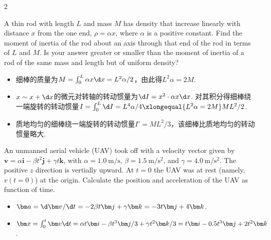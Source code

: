 \begin{paracol}{2}
    \begin{problem} %
        A thin rod with length $L$ and mass $M$ has density that increase linearly with distance $x$ from the one end, $\rho=\alpha x$, where $\alpha$ is a positive constant. Find the moment of inertia of the rod about an axis through that end of the rod in terms of $L$ and $M$. Is your answer greater or smaller than the moment of inertia of a rod of the same mass and length but of uniform density?
        \switchcolumn\vspace*{\fill}\centering
        \vspace*{\fill}
    \end{problem}
\end{paracol}
\begin{solution}\leavevmode
    \begin{itemize}
        \item 细棒的质量为$M=\int_0^L{\alpha x\d x}=L^2\alpha/2$，由此得$L^2\alpha=2M$.
        \item $x\sim x+\d x$的微元对转轴的转动惯量为$\d I=x^2\cdot\alpha x\d x$. 对其积分得细棒绕一端旋转的转动惯量$I=\int_0^L\d I=L^4\alpha/4\xlongequal{L^2\alpha=2M}ML^2/2$.
        \item 质地均匀的细棒绕一端旋转的转动惯量$I'=ML^2/3$，该细棒比质地均匀的转动惯量略大.
    \end{itemize}
\end{solution}

\begin{problem} %
    An unmanned aerial vehicle (UAV) took off with a velocity vector given by $\bm v=\alpha\bm i-\beta t^2\bm j+\gamma t\bm k$, with $\alpha=\qty{1.0}{\m/\s}$, $\beta=\qty{1.5}{\m/\s^2}$, and $\gamma=\qty{4.0}{\m/\s^2}$. The positive $z$ direction is vertially upward. At $t=0$ the UAV was at rest (namely, $v(t=0)$) at the origin. Calculate the position and acceleration of the UAV as function of time.
\end{problem}
\begin{solution}
\begin{itemize}
    \item $\bm a=\d \bm v/\d t=-2\beta t\bm j+\gamma\bm k=-3t\bm j+4\bm k$.
    \item $\bm x=\int_0^t\bm v\d t=\alpha t\bm i-\beta t^3\bm j/3+\gamma t^2\bm k/3=t\bm i-0.5t^3\bm j+2t^2\bm k$.
\end{itemize}
\end{solution}


